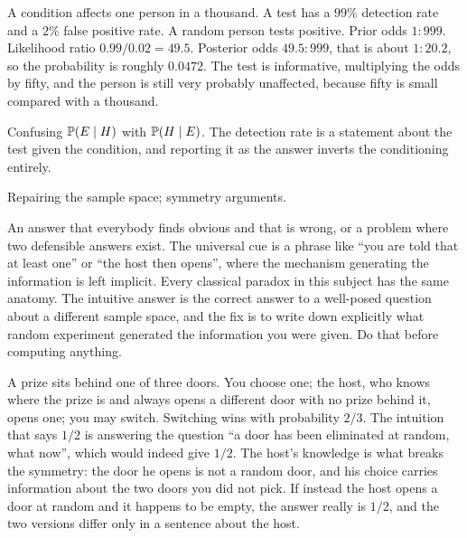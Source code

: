 \begin{worked}
A condition affects one person in a thousand. A test has a $99\%$ detection rate and a $2\%$ false positive rate. A random person tests positive. Prior odds $1:999$. Likelihood ratio $0.99/0.02=49.5$. Posterior odds $49.5:999$, that is about $1:20.2$, so the probability is roughly $0.0472$. The test is informative, multiplying the odds by fifty, and the person is still very probably unaffected, because fifty is small compared with a thousand.
\end{worked}

\begin{trap}
Confusing $\mathbb{P}(E\mid H)$ with $\mathbb{P}(H\mid E)$. The detection rate is a statement about the test given the condition, and reporting it as the answer inverts the conditioning entirely.
\end{trap}

\begin{seealsob}Repairing the sample space; symmetry arguments.\end{seealsob}

\cue An answer that everybody finds obvious and that is wrong, or a problem where two defensible answers exist. The universal cue is a phrase like ``you are told that at least one'' or ``the host then opens'', where the mechanism generating the information is left implicit.
\method Every classical paradox in this subject has the same anatomy. The intuitive answer is the correct answer to a well-posed question about a different sample space, and the fix is to write down explicitly what random experiment generated the information you were given. Do that before computing anything.

\begin{worked}
A prize sits behind one of three doors. You choose one; the host, who knows where the prize is and always opens a different door with no prize behind it, opens one; you may switch. Switching wins with probability $2/3$. The intuition that says $1/2$ is answering the question ``a door has been eliminated at random, what now'', which would indeed give $1/2$. The host's knowledge is what breaks the symmetry: the door he opens is not a random door, and his choice carries information about the two doors you did not pick. If instead the host opens a door at random and it happens to be empty, the answer really is $1/2$, and the two versions differ only in a sentence about the host.
\end{worked}


